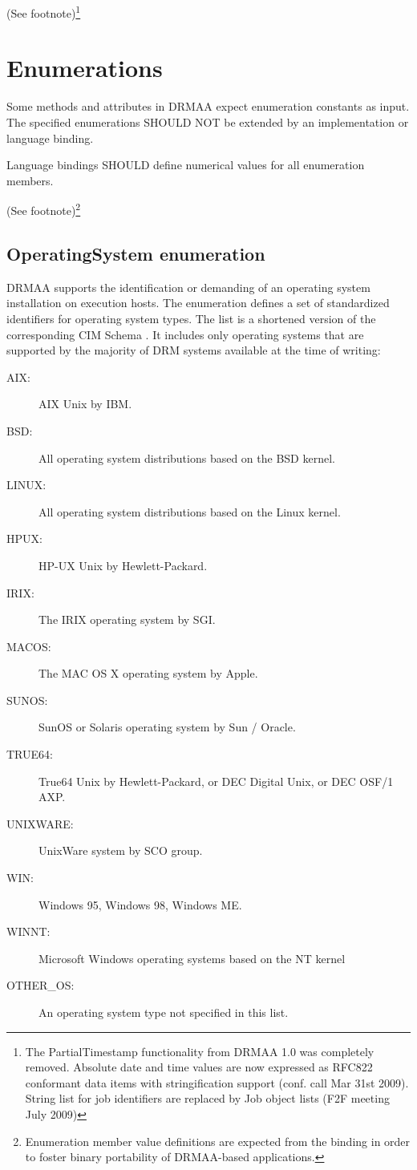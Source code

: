 \documentclass{article}
\newcommand{\langbind}[1]{\begin{shaded}#1\end{shaded}}
\newcommand{\rat}[1]{ {\tiny(See footnote)}\footnote{#1} }
\begin{document}
\rat{
The PartialTimestamp functionality from DRMAA 1.0 was completely removed. Absolute date and time values are now expressed as RFC822 conformant data items with stringification support (conf. call Mar 31st 2009). String list for job identifiers are replaced by Job object lists (F2F meeting July 2009)
}	
	
\section{Enumerations}

Some methods and attributes in DRMAA expect enumeration constants as input. The specified enumerations SHOULD NOT be extended by an implementation or language binding.

\langbind{
Language bindings SHOULD define numerical values for all enumeration members.
}

\rat{Enumeration member value definitions are expected from the binding in order to foster binary portability of DRMAA-based applications.} 

\subsection{OperatingSystem enumeration}
\label{sec:ostypes}

DRMAA supports the identification or demanding of an operating system installation on execution hosts. The enumeration defines a set of standardized identifiers for operating system types. The list is a shortened version of the corresponding CIM Schema \cite{cim}. It includes only operating systems that are supported by the majority of DRM systems available at the time of writing:



\begin{description}
\item[AIX:] AIX Unix by IBM.
\item[BSD:] All operating system distributions based on the BSD kernel.
\item[LINUX:] All operating system distributions based on the Linux kernel.
\item[HPUX:] HP-UX Unix by Hewlett-Packard.
\item[IRIX:] The IRIX operating system by SGI.
\item[MACOS:] The MAC OS X operating system by Apple.
\item[SUNOS:] SunOS or Solaris operating system by Sun / Oracle.
\item[TRUE64:] True64 Unix by Hewlett-Packard, or DEC Digital Unix, or DEC OSF/1 AXP.
\item[UNIXWARE:] UnixWare system by SCO group.
\item[WIN:] Windows 95, Windows 98, Windows ME.
\item[WINNT:] Microsoft Windows operating systems based on the NT kernel
\item[OTHER\_OS:] An operating system type not specified in this list.
\end{description}
\end{document}
